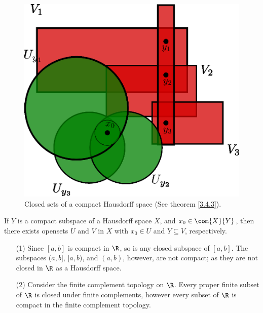 \begin{figure}[h]
    \centering
    \includegraphics[scale=0.5]{Figures/chapter3/compact_hausdorf_space.eps}
    \caption{Closed sets of a compact Hausdorff space (See theorem \ref{3.4.3}).}
    \label{fig_3.1}
\end{figure}

\begin{corollary}
    If $Y$ is a compact subspace of a Hausdorff space $X$, and  $ x_0 \in \com{X}{Y}$, then there
    exists opensets $U$ and  $V$ in  $X$ with  $ x_0 \in U$ and $Y \subseteq V$, respectively.
\end{corollary}

\begin{example}
    \begin{enumerate}
        \item[(1)] Since $[a,b]$ is compact in $\R$, so is any closed subspace of  $[a,b]$. The
            subspaces $(a,b]$, $[a,b)$, and $(a,b)$, however, are not compact; as they are not
            closed in $\R$ as a Hausdorff space.

        \item [(2)] Consider the finite complement topology on $\R$. Every proper finite subset of
            $\R$ is closed under finite complements, however every subset of  $\R$ is compact in the
            finite complement topology.
    \end{enumerate}
\end{example}

